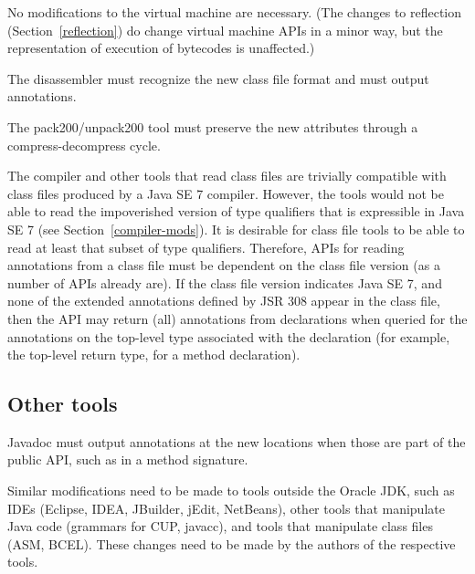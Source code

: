 \documentclass[10pt]{article}
\begin{document}
No modifications to the virtual machine are necessary.
(The changes to reflection (Section~\ref{reflection}) do change virtual
machine APIs in a minor way, but the representation of execution of
bytecodes is unaffected.)

The  disassembler must recognize the new class
file format and must output annotations.

The pack200/unpack200 tool must preserve the new attributes through a
compress-decompress cycle.


The compiler and other tools that read class files are trivially compatible
with class files produced by a Java SE 7 compiler.  However, the tools
would not be able to read the impoverished version of type qualifiers that
is expressible in Java SE 7 (see Section~\ref{compiler-mods}).  It is
desirable for class file tools to be able to read at least that subset of
type qualifiers.  Therefore, APIs for reading annotations from a class file
must be dependent on the class file version (as a number of APIs already
are).  If the class file version indicates Java SE 7, and none of the
extended annotations defined by JSR 308 appear in the class file, then the
API may return (all) annotations from declarations when queried for the
annotations on the top-level type associated with the declaration (for
example, the top-level return type, for a method declaration).


\subsection{Other tools\label{other-tools}}

Javadoc must output annotations at the new locations when those are part
of the public API, such as in a
method signature.


Similar modifications need to be made to tools outside the Oracle JDK,
such as IDEs (Eclipse, IDEA, JBuilder, jEdit, NetBeans), other tools that
manipulate Java code (grammars for CUP, javacc), and tools that
manipulate class files (ASM, BCEL\@).  These changes need to be made by the
authors of the respective tools.
\end{document}
